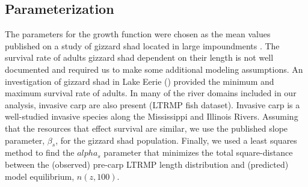 \documentclass[preprint,review,12pt,authoryear]{elsarticle}
\begin{document}
\subsection{Parameterization}
The parameters for the growth function were chosen as the mean values published on a study of gizzard shad located in large impoundments \citep{michaletz2017variation}. 
The survival rate of adults gizzard shad dependent on their length is not well documented and required us to make some additional modeling assumptions.  
An investigation of gizzard shad in Lake Eerie (\cite{bodola1955life}) provided the minimum and maximum survival rate of adults. 
In many of the river domains included in our analysis, invasive carp are also present (LTRMP fish dataset).  
Invasive carp is a well-studied invasive species along the Mississippi and Illinois Rivers.  
Assuming that the resources that effect survival are similar, we use the published \citep{erickson2017integral} slope parameter, $\beta_s$, for the gizzard shad population.   
Finally, we used a least squares method to find the $alpha_s$ parameter that 
minimizes the total square-distance between the (observed) pre-carp LTRMP length distribution and (predicted) model equilibrium, $n(z,100)$.  
%
%
\end{document}
